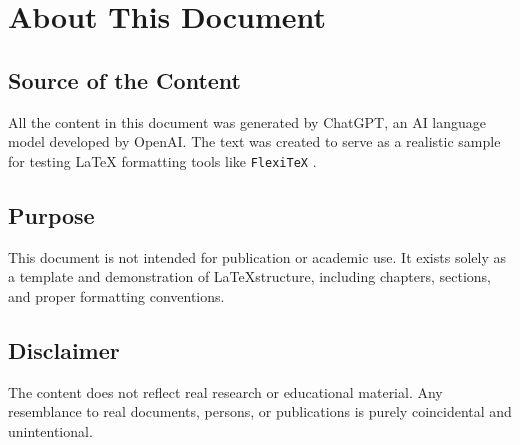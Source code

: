 \documentclass{report}
\begin{document}
\chapter{About This Document}
\section{Source of the Content}
All the content in this document was generated by ChatGPT, an AI language model developed by OpenAI. The text was created to serve as a realistic sample for testing LaTeX formatting tools like
\texttt{Flexi\TeX}
.
\section{Purpose}
This document is not intended for publication or academic use. It exists solely as a template and demonstration of
\LaTeX structure, including chapters, sections, and proper formatting conventions.
\section{Disclaimer}
The content does not reflect real research or educational material. Any resemblance to real documents, persons, or publications is purely coincidental and unintentional.
\end{document}
